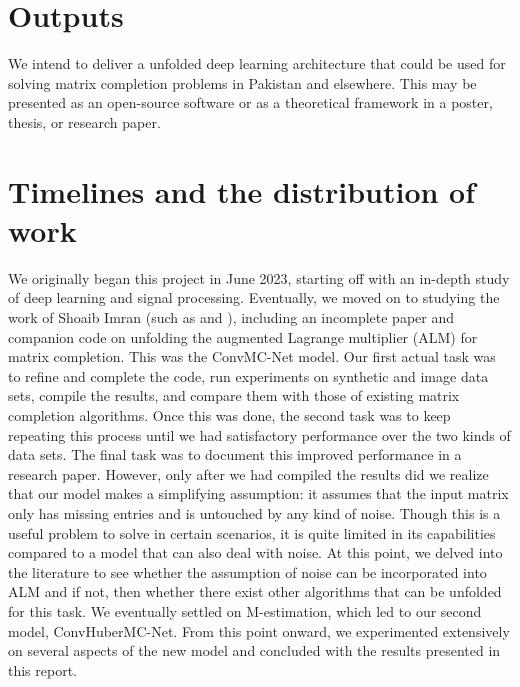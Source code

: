 \section{Outputs}
We intend to deliver a unfolded deep learning architecture that could be used for solving matrix completion problems in Pakistan and elsewhere. This may be presented as an open-source software or as a theoretical framework in a poster, thesis, or research paper.

\section{Timelines and the distribution of work}
We originally began this project in June 2023, starting off with an in-depth study of deep learning and signal processing. Eventually, we moved on to studying the work of Shoaib Imran (such as \cite{duparpca} and \cite{dustrpca}), including an incomplete paper and companion code on unfolding the augmented Lagrange multiplier (ALM) for matrix completion. This was the ConvMC-Net model. Our first actual task was to refine and complete the code, run experiments on synthetic and image data sets, compile the results, and compare them with those of existing matrix completion algorithms. Once this was done, the second task was to keep repeating this process until we had satisfactory performance over the two kinds of data sets. The final task was to document this improved performance in a research paper. However, only after we had compiled the results did we realize that our model makes a simplifying assumption: it assumes that the input matrix only has missing entries and is untouched by any kind of noise. Though this is a useful problem to solve in certain scenarios, it is quite limited in its capabilities compared to a model that can also deal with noise. At this point, we delved into the literature to see whether the assumption of noise can be incorporated into ALM and if not, then whether there exist other algorithms that can be unfolded for this task. We eventually settled on M-estimation, which led to our second model, ConvHuberMC-Net. From this point onward, we experimented extensively on several aspects of the new model and concluded with the results presented in this report. 

